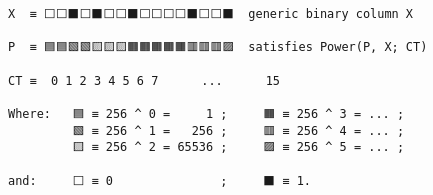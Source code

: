 \documentclass[varwidth=\maxdimen,margin=0.5cm,multi={verbatim}]{standalone}
\begin{document}
\begin{verbatim}
X  ≡ ⬜⬜⬛⬜⬛⬜⬜⬛⬜⬜⬜⬜⬛⬜⬜⬛  generic binary column X
                     
P  ≡ 🟦🟦🟩🟩🟨🟨🟨🟧🟧🟧🟧🟧🟥🟥🟥🟪  satisfies Power(P, X; CT)

CT ≡  0 1 2 3 4 5 6 7      ...      15

Where:   🟦 ≡ 256 ^ 0 =     1 ;     🟧 ≡ 256 ^ 3 = ... ;
         🟩 ≡ 256 ^ 1 =   256 ;     🟥 ≡ 256 ^ 4 = ... ;
         🟨 ≡ 256 ^ 2 = 65536 ;     🟪 ≡ 256 ^ 5 = ... ;
       
and:     ⬜ ≡ 0               ;     ⬛ ≡ 1.
\end{verbatim}
\end{document}
